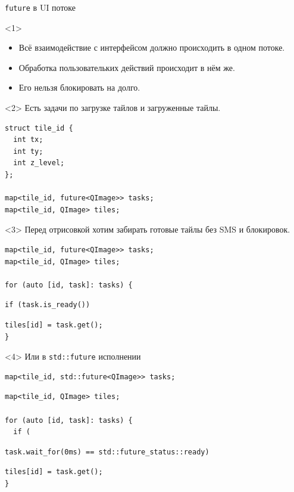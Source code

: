 \documentclass[aspectratio=169,hyperref={unicode},17pt]{beamer}
\begin{document}
\begin{frame}[fragile,t]{\texttt{future} в UI потоке}
\begin{onlyenv}<1>
\begin{itemize}
 \item Всё взаимодействие с интерфейсом должно происходить в одном потоке.
 \item Обработка пользовательких действий происходит в нём же.
 \item Его нельзя блокировать на долго.
\end{itemize}
\end{onlyenv}
\begin{onlyenv}<2>
Есть задачи по загрузке тайлов и загруженные тайлы.
\begin{lstlisting}[style=cppcode]
struct tile_id {
  int tx;
  int ty;
  int z_level;
};

map<tile_id, future<QImage>> tasks;
map<tile_id, QImage> tiles;
 \end{lstlisting}
\end{onlyenv}
\begin{onlyenv}<3>
Перед отрисовкой хотим забирать готовые тайлы без SMS и блокировок.
 \begin{lstlisting}[style=cppcode,belowskip=0pt]
map<tile_id, future<QImage>> tasks;
map<tile_id, QImage> tiles;

for (auto [id, task]: tasks) {
\end{lstlisting}
\begin{lstlisting}[style=cppcode,backgroundcolor=\color{gray!30},aboveskip=0pt,belowskip=0pt]
  if (task.is_ready())
\end{lstlisting}
\begin{lstlisting}[style=cppcode,aboveskip=0pt,belowskip=0pt]
    tiles[id] = task.get();
}
 \end{lstlisting}
\end{onlyenv}
\begin{onlyenv}<4>
Или в \texttt{std::future} исполнении
 \begin{lstlisting}[style=cppcode,backgroundcolor=\color{gray!30},belowskip=0pt]
map<tile_id, std::future<QImage>> tasks;
\end{lstlisting}
\begin{lstlisting}[style=cppcode,aboveskip=0pt,belowskip=0pt]
map<tile_id, QImage> tiles;

for (auto [id, task]: tasks) {
  if (
\end{lstlisting}
\begin{lstlisting}[style=cppcode,backgroundcolor=\color{gray!30},aboveskip=0pt,belowskip=0pt]
    task.wait_for(0ms) == std::future_status::ready)
\end{lstlisting}
\begin{lstlisting}[style=cppcode,aboveskip=0pt,belowskip=0pt]
    tiles[id] = task.get();
}
 \end{lstlisting}
\end{onlyenv}
\end{frame}
\end{document}
